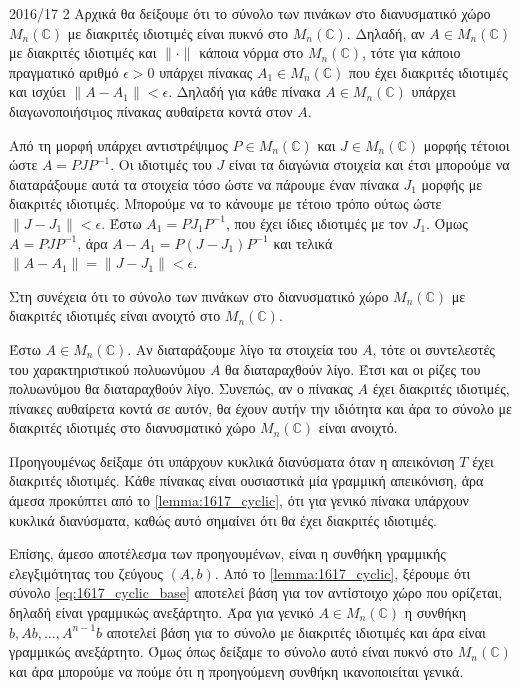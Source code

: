 \documentclass[a4paper,11pt]{article}
\begin{document}
\begin{solution}{2016/17 2}
    Αρχικά θα δείξουμε ότι το σύνολο των πινάκων στο διανυσματικό χώρο
    \( M_n(\mathbb{C}) \) με διακριτές ιδιοτιμές είναι πυκνό στο \( M_n(\mathbb{C}) \).
    Δηλαδή, αν \( A \in M_n(\mathbb{C}) \) με διακριτές ιδιοτιμές και
    \( \| \cdot \| \) κάποια νόρμα στο  \( M_n(\mathbb{C}) \), τότε για κάποιο
    πραγματικό αριθμό \( \epsilon > 0\) υπάρχει πίνακας \( A_1 \in M_n(\mathbb{C}) \)
    που έχει διακριτές ιδιοτιμές και ισχύει \( \| A - A_1 \| < \epsilon \).
    Δηλαδή για κάθε πίνακα \( A \in M_n(\mathbb{C}) \) υπάρχει διαγωνοποιήσιµος
    πίνακας αυθαίρετα κοντά στον \( A \).

    Από τη μορφή  υπάρχει αντιστρέψιμος \( P \in M_n(\mathbb{C}) \)
    και \( J \in M_n(\mathbb{C}) \) μορφής  τέτοιοι ώστε \( A =
    PJP^{-1} \). Οι ιδιοτιμές του \( J \) είναι τα διαγώνια στοιχεία και έτσι μπορούμε
    να διαταράξουμε αυτά τα στοιχεία τόσο ώστε να πάρουμε έναν πίνακα
    \( J_1 \) μορφής  με διακριτές ιδιοτιμές. Μπορούμε να το κάνουμε
    με τέτοιο τρόπο ούτως ώστε \( \| J - J_1 \| < \epsilon \). Έστω \( A_1 =
    PJ_1P^{-1} \), που έχει ίδιες ιδιοτιμές με τον \( J_1 \). Όμως \( A =
    PJP^{-1} \), άρα \( A - A_1 = P(J - J_1)P^{-1} \) και τελικά \( \| A - A_1
    \| = \| J - J_1 \| < \epsilon \).

    Στη συνέχεια ότι το σύνολο των πινάκων στο διανυσματικό χώρο
    \( M_n(\mathbb{C}) \) με διακριτές ιδιοτιμές είναι ανοιχτό στο \( M_n(\mathbb{C}) \).

    Έστω \( A \in M_n(\mathbb{C}) \). Αν διαταράξουμε λίγο τα στοιχεία
    του \( A \), τότε οι συντελεστές του χαρακτηριστικού πολυωνύμου \( A \) θα
    διαταραχθούν λίγο. Έτσι και οι ρίζες του πολυωνύμου θα διαταραχθούν
    λίγο. Συνεπώς, αν ο πίνακας \( A \) έχει διακριτές ιδιοτιμές,
    πίνακες αυθαίρετα κοντά σε αυτόν, θα έχουν αυτήν την ιδιότητα και άρα το
    σύνολο με διακριτές ιδιοτιμές στο διανυσματικό χώρο \( M_n(\mathbb{C}) \) είναι ανοιχτό.

    Προηγουμένως δείξαμε ότι υπάρχουν κυκλικά διανύσματα όταν η απεικόνιση
    \( T \) έχει διακριτές ιδιοτιμές. Κάθε πίνακας είναι ουσιαστικά μία γραμμική απεικόνιση,
    άρα άμεσα προκύπτει από το \ref{lemma:1617_cyclic}, ότι για γενικό
    πίνακα υπάρχουν κυκλικά διανύσματα, καθώς αυτό σημαίνει ότι θα έχει διακριτές ιδιοτιμές.

    Επίσης, άμεσο αποτέλεσμα των προηγουμένων, είναι η συνθήκη γραμμικής
    ελεγξιμότητας του ζεύγους \( (A, b) \). Από το \ref{lemma:1617_cyclic},
    ξέρουμε ότι σύνολο \eqref{eq:1617_cyclic_base} αποτελεί βάση για τον
    αντίστοιχο χώρο που ορίζεται, δηλαδή είναι γραμμικώς ανεξάρτητο. Άρα
    για γενικό \( A \in M_n(\mathbb{C}) \) η συνθήκη
    \(b, Ab, \dots, A^{n-1}b \) αποτελεί βάση για το σύνολο με διακριτές
    ιδιοτιμές και άρα είναι γραμμικώς ανεξάρτητο. Όμως όπως δείξαμε το σύνολο
    αυτό είναι πυκνό στο \( M_n(\mathbb{C}) \) και άρα μπορούμε να πούμε ότι η
    προηγούμενη συνθήκη ικανοποιείται γενικά.
\end{solution}
\end{document}
